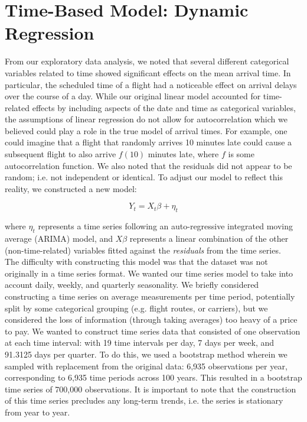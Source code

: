 \documentclass[12pt, a4paper, openany]{book}
\newcommand\tab[1][1cm]{\hspace*{#1}}
\begin{document}
	\section{Time-Based Model: Dynamic Regression}
	\tab From our exploratory data analysis, we noted that several different categorical variables related to time showed significant effects on the mean arrival time. In particular, the scheduled time of a flight had a noticeable effect on arrival delays over the course of a day. While our original linear model accounted for time-related effects by including aspects of the date and time as categorical variables, the assumptions of linear regression do not allow for autocorrelation which we believed could play a role in the true model of arrival times.  For example, one could imagine that a flight that randomly arrives 10 minutes late could cause a subsequent flight to also arrive $f(10)$ minutes late, where $f$ is some autocorrelation function. We also noted that the residuals did not appear to be random; i.e. not independent or identical. To adjust our model to reflect this reality, we constructed a new model: 
	\begin{center}
	$$Y_t = X_t\beta + \eta_t$$
	\end{center}
	where $\eta_t$ represents a time series following an auto-regressive integrated moving average (ARIMA) model, and $X\beta$ represents a linear combination of the other (non-time-related) variables fitted against the \textit{residuals} from the time series. \\
	\tab The difficulty with constructing this model was that the dataset was not originally in a time series format. We wanted our time series model to take into account daily, weekly, and quarterly seasonality. We briefly considered constructing a time series on average measurements per time period, potentially split by some categorical grouping (e.g. flight routes, or carriers), but we considered the loss of information (through taking averages) too heavy of a price to pay. We wanted to construct time series data that consisted of one observation at each time interval: with 19 time intervals per day, 7 days per week, and 91.3125 days per quarter. To do this, we used a bootstrap method wherein we sampled with replacement from the original data: 6,935 observations per year, corresponding to 6,935 time periods across 100 years. This resulted in a bootstrap time series of 700,000 observations. It is important to note that the construction of this time series precludes any long-term trends, i.e. the series is stationary from year to year. \\
\end{document}
